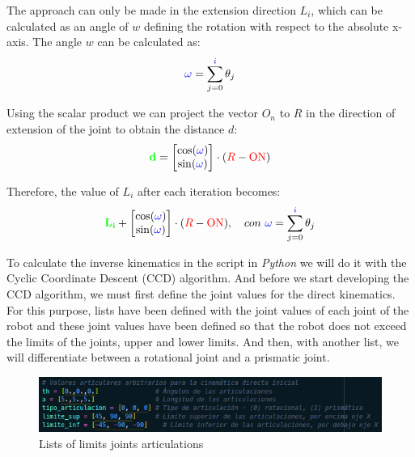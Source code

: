 \documentclass[11pt]{report}
\begin{document}
The approach can only be made in the extension direction $L_i$, which can be calculated as an angle of $w$ defining the
rotation with respect to the absolute x-axis. The angle $w$ can be calculated as:
\begin{equation*}
  \color{blue}\omega\color{black} = \sum_{j = 0}^{\color{blue}i\color{black}} \theta_j
\end{equation*}

Using the scalar product we can project the vector $O_n$ to $R$ in the direction of extension of the joint to obtain the distance $d$:
\begin{equation*}
  \color{green} \mathbf{d} \color{black} =
  \begin{bmatrix}
    \cos(\color{blue}\omega\color{black}) \\
    \sin(\color{blue}\omega\color{black})
  \end{bmatrix}
  \cdot (\color{red}R\color{black}- \color{red}\text{ON}\color{black})
\end{equation*}

Therefore, the value of $L_i$ after each iteration becomes:
\begin{equation*}
  \color{green} \mathbf{L_i} \color{black} +
  \begin{bmatrix}
    \cos(\color{blue}\omega\color{black}) \\
    \sin(\color{blue}\omega\color{black})
  \end{bmatrix}
  \cdot (\color{red}R\color{black}- \color{red}\text{ON}\color{black}),\ \ \ con \ 
  \color{blue}\omega\color{black} = \sum_{j = 0}^{\color{blue}i\color{black}} \theta_j
\end{equation*}

To calculate the inverse kinematics in the script in \emph{Python} we will do it with the Cyclic Coordinate Descent (CCD) algorithm. 
And before we start developing the CCD algorithm, we must first define the joint values for the direct kinematics.
For this purpose, lists have been defined with the joint values of each joint of the robot and these joint values 
have been defined so that the robot does not exceed the limits of the joints, upper and lower limits. And then, with 
another list, we will differentiate between a rotational joint and a prismatic joint.

\begin{figure}[H]
  \centering
  \includegraphics[scale=0.7]{img/listas_ci.png}
  \caption{Lists of limits joints articulations}
\end{figure}
\end{document}
